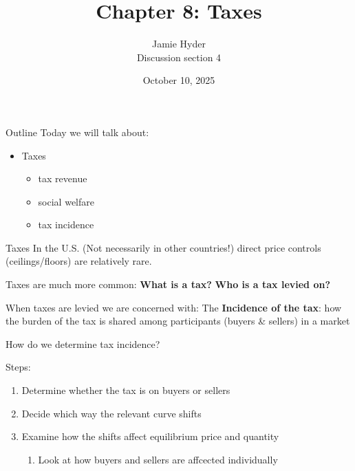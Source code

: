 \documentclass[compress]{beamer}
\title{Chapter 8: Taxes}
\author{Jamie Hyder \\
    Discussion section 4}
\date{October 10, 2025}
\begin{document}
\begin{frame}
    \titlepage 
\end{frame}

\begin{frame}{Outline}
    Today we will talk about:
    \begin{itemize}
        \item Taxes
        \begin{itemize}
            \item tax revenue
            \item social welfare
            \item tax incidence
        \end{itemize}
    \end{itemize}
\end{frame}


\begin{frame}{Taxes}
In the U.S. (Not necessarily in other countries!) direct price controls (ceilings/floors) are relatively rare.

\medskip

Taxes are much more common: \textbf{What is a tax?} \textbf{Who is a tax levied on?}

\medskip

\begin{block}{When taxes are levied we are concerned with:}
    The \textbf{Incidence of the tax}: how the burden of the tax is shared among participants (buyers \& sellers) in a market
\end{block}
\end{frame}

\begin{frame}{How do we determine tax incidence?}
    \begin{block}{Steps:}
        \begin{enumerate}
            \item Determine whether the tax is on buyers or sellers
            \item Decide which way the relevant curve shifts
            \item Examine how the shifts affect equilibrium price and quantity
            \begin{enumerate}
                \item Look at how buyers and sellers are affcected individually
            \end{enumerate}
        \end{enumerate}
    \end{block}
\end{frame}
\end{document}

